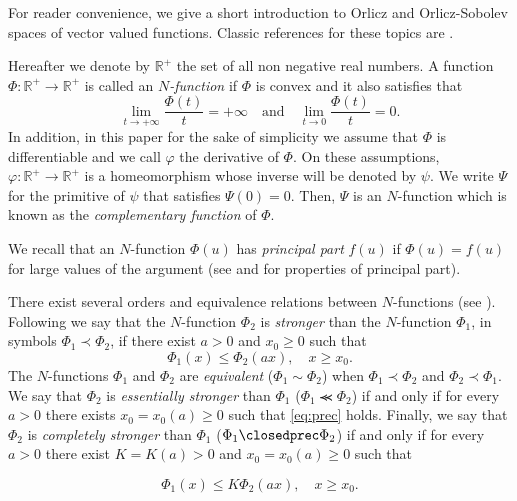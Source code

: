 \documentclass[twoside]{elsarticle}
\theoremstyle{remark}
\renewcommand{\leq}{\leqslant}
\renewcommand{\geq}{\geqslant}
\begin{document}
For reader convenience, we give a short introduction to Orlicz and Orlicz-Sobolev spaces of vector valued functions. Classic references for these topics are \cite{adams_sobolev,KR,rao1991theory,M}. 

Hereafter we denote  by $\mathbb{R}^+$  the set of all non negative real numbers. A function $\Phi:\mathbb{R}^+\to \mathbb{R}^+ $ is called an \emph{$N$-function} if $\Phi$ is convex and it also satisfies that
\[
\lim_{t\to+\infty}\frac{\Phi(t)}{t}=+\infty\quad\text{and}\quad \lim_{t\to 0}\frac{\Phi(t)}{t}=0.
\]
In addition,  in this paper for the sake of simplicity  we assume that $\Phi$ is differentiable and we call $\varphi$  the derivative of $\Phi$. 
On these assumptions, $\varphi:\mathbb{R}^+\rightarrow \mathbb{R}^+$ is a homeomorphism whose inverse will be denoted by $\psi$. 
We write $\Psi$ for the primitive of $\psi$ that satisfies $\Psi(0)=0$. Then, $\Psi$ is an $N$-function which  is known as the \emph{complementary function} of $\Phi$.

 We recall that an $N$-function $\Phi(u)$ has \emph{principal part} $f(u)$ if $\Phi(u)=f(u)$ for large values of the argument (see \cite[p. 16]{KR} and \cite[Sec. 7]{KR} for  properties of principal part).

There exist several orders and equivalence relations between $N$-functions (see \cite[Sec. 2.2]{rao1991theory}).
Following \cite[Def. 1, pp. 15-16]{rao1991theory} we say that the   $N$-function $\Phi_2$ is \emph{stronger} than the $N$-function  $\Phi_1$, in symbols  $\Phi_1\prec\Phi_2$, if  there exist $a>0$ and $x_0\geq 0$ such that
\begin{equation}\label{eq:prec}\Phi_1(x)\leq \Phi_2(ax), \quad x\geq x_0.\end{equation}
 The $N$-functions  $\Phi_1$ and   $\Phi_2$ are \emph{equivalent} ($\Phi_1\sim\Phi_2$)  when  $\Phi_1\prec\Phi_2$ and $\Phi_2\prec\Phi_1$.
We say that  $\Phi_2$ is \emph{essentially stronger} than  $\Phi_1$  ($\Phi_1\llcurly\Phi_2$) if and only if for every $a>0$ there exists $x_0=x_0(a)\geq 0$ such that \eqref{eq:prec} holds. Finally, we say that  $\Phi_2$ is \emph{completely stronger} than  $\Phi_1$  ($\Phi_1\closedprec\Phi_2$) if and only if for every $a>0$ there exist $K=K(a)>0$ and  $x_0=x_0(a)\geq 0$ such that


\begin{equation}\label{eq:prec2}\Phi_1(x)\leq K\Phi_2(ax), \quad x\geq x_0.\end{equation}
\end{document}
